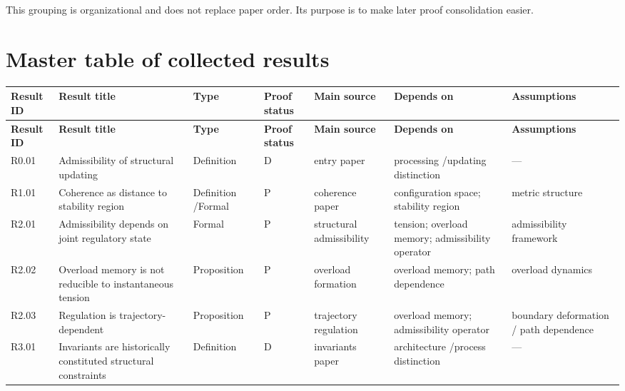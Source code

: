 \documentclass[12pt]{article}
\begin{document}
	This grouping is organizational and does not replace paper order. Its purpose is to make later
	proof consolidation easier.
	
	\section{Master table of collected results}
	
	\begin{longtable}{>{\RaggedRight\arraybackslash}p{}
			>{\RaggedRight\arraybackslash}p{}
			>{\RaggedRight\arraybackslash}p{}
			>{\RaggedRight\arraybackslash}p{}
			>{\RaggedRight\arraybackslash}p{}
			>{\RaggedRight\arraybackslash}p{}
			>{\RaggedRight\arraybackslash}p{}}
		\toprule
		\textbf{Result ID} & \textbf{Result title} & \textbf{Type} & \textbf{Proof status} & \textbf{Main source} & \textbf{Depends on} & \textbf{Assumptions} \\
		\midrule
		\endfirsthead
		\toprule
		\textbf{Result ID} & \textbf{Result title} & \textbf{Type} & \textbf{Proof status} & \textbf{Main source} & \textbf{Depends on} & \textbf{Assumptions} \\
		\midrule
		\endhead
		
		R0.01 & Admissibility of structural updating & Definition & D & entry paper & processing /updating distinction & --- \\
		
		R1.01 & Coherence as distance to stability region & Definition /Formal & P & coherence paper & configuration space; stability region & metric structure \\
		
		R2.01 & Admissibility depends on joint regulatory state & Formal & P & structural admissibility & tension; overload memory; admissibility operator & admissibility framework \\
		
		R2.02 & Overload memory is not reducible to instantaneous tension & Proposition & P & overload formation & overload memory; path dependence & overload dynamics \\
		
		R2.03 & Regulation is trajectory-dependent & Proposition & P & trajectory regulation & overload memory; admissibility operator & boundary deformation / path dependence \\
		
		R3.01 & Invariants are historically constituted structural constraints & Definition & D & invariants paper & architecture /process distinction & --- \\
		

\end{longtable}
\end{document}
